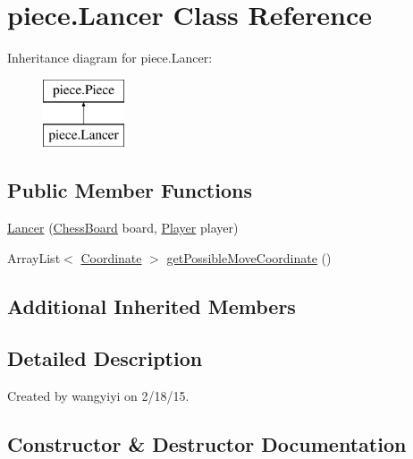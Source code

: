 \hypertarget{classpiece_1_1_lancer}{}\section{piece.\+Lancer Class Reference}
\label{classpiece_1_1_lancer}
Inheritance diagram for piece.\+Lancer\+:\begin{figure}[H]
\begin{center}
\leavevmode
\includegraphics[height=2.000000cm]{classpiece_1_1_lancer}
\end{center}
\end{figure}
\subsection*{Public Member Functions}
\begin{DoxyCompactItemize}
\item 
\hyperlink{classpiece_1_1_lancer_a50616ad4693ed4d3923a447ecc36d893}{Lancer} (\hyperlink{classchessboard_1_1_chess_board}{Chess\+Board} board, \hyperlink{enumchessboard_1_1_player}{Player} player)
\item 
Array\+List$<$ \hyperlink{classpiece_1_1_coordinate}{Coordinate} $>$ \hyperlink{classpiece_1_1_lancer_ad347a5eb8ae6db14e7a112ae640d3c88}{get\+Possible\+Move\+Coordinate} ()
\end{DoxyCompactItemize}
\subsection*{Additional Inherited Members}


\subsection{Detailed Description}
Created by wangyiyi on 2/18/15. 

\subsection{Constructor \& Destructor Documentation}
\hypertarget{classpiece_1_1_lancer_a50616ad4693ed4d3923a447ecc36d893}{}
